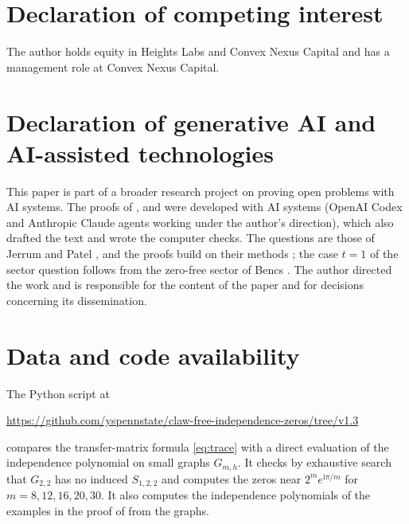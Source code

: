 \documentclass[11pt]{article}
\theoremstyle{remark}
\begin{document}
\section*{Declaration of competing interest}

The author holds equity in Heights Labs and Convex Nexus Capital and has a management role at Convex Nexus Capital.

\section*{Declaration of generative AI and AI-assisted technologies}

This paper is part of a broader research project on proving open problems with AI systems.
The proofs of ,  and  were developed with AI systems (OpenAI Codex
and Anthropic Claude agents working under the author's direction), which also drafted the text and wrote the computer
checks. The questions are those of Jerrum and Patel \cite[Section~7]{JP}, and the proofs build on their methods
\cite{JP}; the case $t=1$ of the sector question follows from the zero-free sector of Bencs \cite{Bencs}. The author directed the work and is responsible for the content of the paper and for
decisions concerning its dissemination.

\section*{Data and code availability}

The Python script at
\begin{center}
\url{https://github.com/yspennstate/claw-free-independence-zeros/tree/v1.3}
\end{center}
compares the transfer-matrix formula \eqref{eq:trace} with a direct evaluation of the independence polynomial on small
graphs $G_{m,h}$. It checks by exhaustive search that $G_{2,2}$ has no induced $S_{1,2,2}$ and computes the zeros near
$2^me^{\mathrm i\pi/m}$ for $m=8,12,16,20,30$. It also computes the independence polynomials of the examples in the proof of
 from the graphs.
\end{document}

